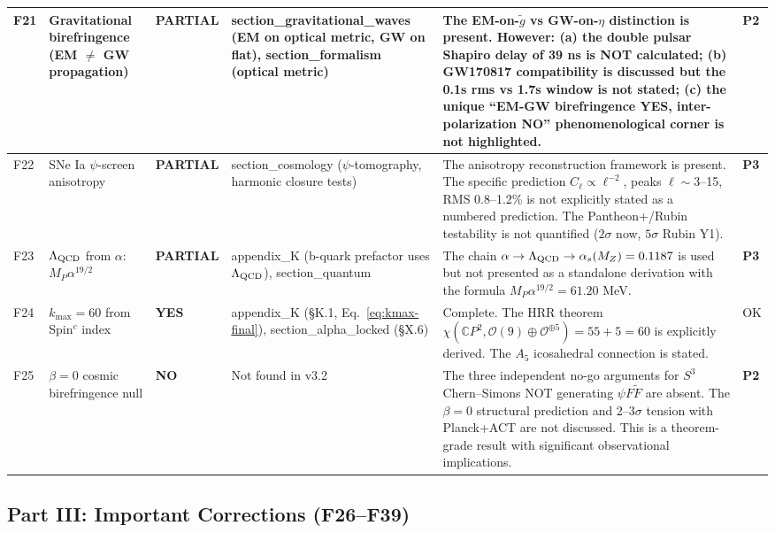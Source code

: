 \documentclass[11pt,a4paper]{article}
\newcommand{\YES}{\textcolor{yes}{\textbf{YES}}}
\newcommand{\PARTIAL}{\textcolor{partial}{\textbf{PARTIAL}}}
\newcommand{\NO}{\textcolor{no}{\textbf{NO}}}
\begin{document}
\begin{longtable}{|p{0.5cm}|p{3.5cm}|p{1.2cm}|p{3.5cm}|p{4.5cm}|p{1cm}|}
F21 & Gravitational birefringence (EM $\neq$ GW propagation) &
\PARTIAL &
section\_gravitational\_waves (EM on optical metric, GW on flat), section\_formalism (optical metric) &
The EM-on-$\tilde{g}$ vs GW-on-$\eta$ distinction is present. However: (a) the double pulsar Shapiro delay of 39 ns is NOT calculated; (b) GW170817 compatibility is discussed but the 0.1s rms vs 1.7s window is not stated; (c) the unique ``EM-GW birefringence YES, inter-polarization NO'' phenomenological corner is not highlighted. &
\textbf{P2} \\
\hline

F22 & SNe Ia $\psi$-screen anisotropy &
\PARTIAL &
section\_cosmology ($\psi$-tomography, harmonic closure tests) &
The anisotropy reconstruction framework is present. The specific prediction $C_\ell \propto \ell^{-2}$, peaks $\ell \sim 3$--15, RMS 0.8--1.2\% is not explicitly stated as a numbered prediction. The Pantheon+/Rubin testability is not quantified ($2\sigma$ now, $5\sigma$ Rubin Y1). &
\textbf{P3} \\
\hline

F23 & $\Lambda_{\rm QCD}$ from $\alpha$: $M_P\alpha^{19/2}$ &
\PARTIAL &
appendix\_K (b-quark prefactor uses $\Lambda_{\rm QCD}$), section\_quantum &
The chain $\alpha \to \Lambda_{\rm QCD} \to \alpha_s(M_Z) = 0.1187$ is used but not presented as a standalone derivation with the formula $M_P\alpha^{19/2} = 61.20$ MeV. &
\textbf{P3} \\
\hline

F24 & $k_{\max} = 60$ from Spin$^c$ index &
\YES &
appendix\_K (\S K.1, Eq.~\eqref{eq:kmax-final}), section\_alpha\_locked (\S X.6) &
Complete. The HRR theorem $\chi(\mathbb{C}P^2, \mathcal{O}(9) \oplus \mathcal{O}^{\oplus 5}) = 55 + 5 = 60$ is explicitly derived. The $A_5$ icosahedral connection is stated. &
OK \\
\hline

F25 & $\beta = 0$ cosmic birefringence null &
\NO &
Not found in v3.2 &
The three independent no-go arguments for $S^3$ Chern--Simons NOT generating $\psi F\tilde{F}$ are absent. The $\beta = 0$ structural prediction and 2--3$\sigma$ tension with Planck+ACT are not discussed. This is a theorem-grade result with significant observational implications. &
\textbf{P2} \\
\hline

\end{longtable}


\subsection{Part III: Important Corrections (F26--F39)}
\end{document}

